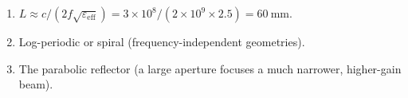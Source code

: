 \begin{enumerate}[leftmargin=1.6em,itemsep=2pt]
\item $L \approx c/(2f\sqrt{\varepsilon_{\text{eff}}}) = 3\times10^{8}/(2\times10^{9}\times2.5) = 60\ \text{mm}$.
\item Log-periodic or spiral (frequency-independent geometries).
\item The parabolic reflector (a large aperture focuses a much narrower, higher-gain beam).
\end{enumerate}
